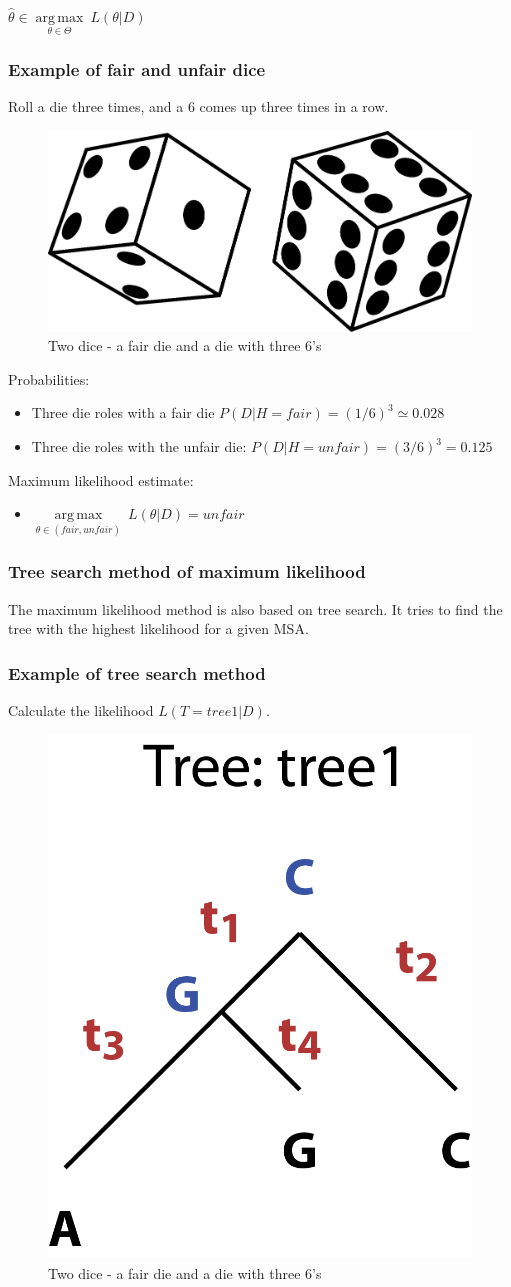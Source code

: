 ${\displaystyle {\hat {\theta }}\in {\underset {\theta \in \Theta }{\operatorname {arg\,max} }}\ L(\theta|D)}$

%
%
\subsubsection*{Example of fair and unfair dice}
Roll a die three times, and a 6 comes up three times in a row.

\begin{figure}[H]
  \centering
      \includegraphics[width=0.3 \textwidth]{fig09/dice_unfair.png}
        \caption{Two dice - a fair die and a die with three 6’s}
\end{figure}

\noindent
Probabilities:
\begin{itemize}
\item Three die roles with a fair die $P(D|H = fair) = (1/6)^3 \simeq 0.028$
\item Three die roles with the unfair die: $P(D|H = unfair) =(3/6)^3 = 0.125$
\end{itemize}

\noindent
Maximum likelihood estimate:
\begin{itemize}
\item ${\displaystyle {\underset {\theta \in (fair, unfair) }{\operatorname {arg\,max} }}\ L(\theta|D)} = unfair$
\end{itemize}

%
%
\subsubsection*{Tree search method of maximum likelihood}
The maximum likelihood method is also based on tree search. It tries to find the tree with the highest likelihood for a given MSA.

%
%
\subsubsection*{Example of tree search method }
Calculate the likelihood $L(T=tree1|D )$.
 
 \begin{figure}[H]
  \centering
      \includegraphics[width=0.2 \textwidth]{fig09/ml_tree.png}
      \caption{Two dice - a fair die and a die with three 6’s}
\end{figure}
 
